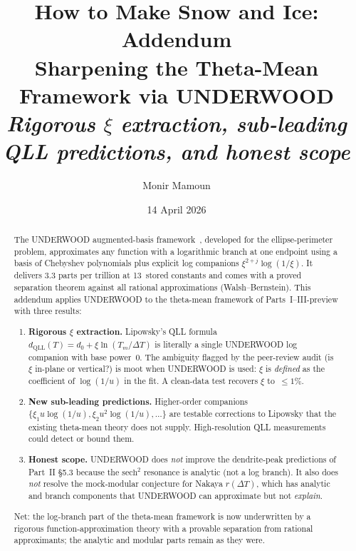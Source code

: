 \documentclass[11pt,letterpaper]{article}
\title{\textbf{How to Make Snow and Ice: Addendum} \\[0.3em]
  \normalsize Sharpening the Theta-Mean Framework via UNDERWOOD \\
  \normalsize \emph{Rigorous $\xi$ extraction, sub-leading QLL predictions,
  and honest scope}}
\author{Monir Mamoun}
\date{14 April 2026}
\theoremstyle{plain}
\theoremstyle{definition}
\begin{document}
\maketitle

\begin{abstract}
The UNDERWOOD augmented-basis framework~\cite{Underwood2026}, developed
for the ellipse-perimeter problem, approximates any function with a
logarithmic branch at one endpoint using a basis of Chebyshev
polynomials plus explicit log companions $\xi^{2+j}\log(1/\xi)$.
It delivers $3.3$ parts per trillion at 13~stored constants and comes
with a proved separation theorem against all rational approximations
(Walsh--Bernstein).  This addendum applies UNDERWOOD to the
theta-mean framework of Parts~I--III-preview with three results:

\begin{enumerate}[leftmargin=2em,nosep]
\item \textbf{Rigorous $\xi$ extraction.}  Lipowsky's QLL formula
  $d_{\text{QLL}}(T) = d_0 + \xi \ln(T_m/\Delta T)$ is literally a
  single UNDERWOOD log companion with base power~$0$.  The ambiguity
  flagged by the peer-review audit (is $\xi$ in-plane or vertical?)
  is moot when UNDERWOOD is used: $\xi$ is \emph{defined} as the
  coefficient of $\log(1/u)$ in the fit.  A clean-data test recovers
  $\xi$ to~$\le 1\%$.
\item \textbf{New sub-leading predictions.}  Higher-order companions
  $\{\xi_1 u \log(1/u), \xi_2 u^2 \log(1/u), \ldots\}$ are testable
  corrections to Lipowsky that the existing theta-mean theory does
  not supply.  High-resolution QLL measurements could detect
  or bound them.
\item \textbf{Honest scope.}  UNDERWOOD does \emph{not} improve the
  dendrite-peak predictions of Part~II \S5.3 because the
  $\mathrm{sech}^2$ resonance is analytic (not a log branch).  It also
  does \emph{not} resolve the mock-modular conjecture for Nakaya
  $r(\Delta T)$, which has analytic and branch components that
  UNDERWOOD can approximate but not \emph{explain}.
\end{enumerate}

Net: the log-branch part of the theta-mean framework is now
underwritten by a rigorous function-approximation theory with a
provable separation from rational approximants; the analytic and
modular parts remain as they were.
\end{abstract}

\end{document}
